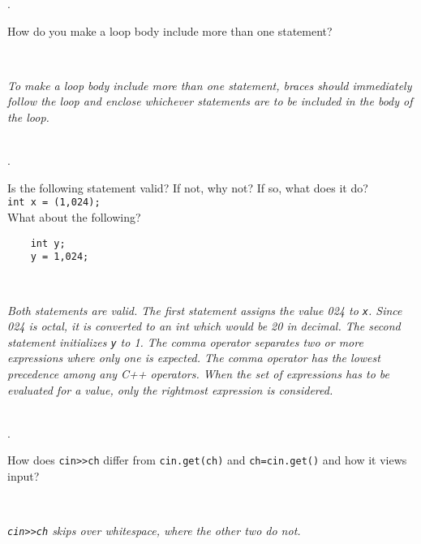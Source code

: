 \documentclass{amsart}
\begin{document}
. 
\begin{minipage}[t]{11.5 cm}
	How do you make a loop body include more than one statement?
\end{minipage} \\[1ex]
\phantom{2. } 
\begin{minipage}[t]{11.5 cm}
	{\slshape To make a loop body include more than one statement, braces should immediately follow the loop and enclose whichever statements are to be included in the body of the loop.} 
\end{minipage} 
\\[.2cm]

. 
\begin{minipage}[t]{11.5 cm}
	Is the following statement valid? If not, why not? If so, what does it do? \\[1ex]
\verb+int x = (1,024);+ \\[1 ex]
What about the following?
\begin{verbatim}
	int y;
	y = 1,024;
\end{verbatim}
\end{minipage} \\[1ex]
\phantom{3. } 
\begin{minipage}[t]{11.5 cm}
	{\slshape Both statements are valid. The first statement assigns the value 024 to \texttt{x}. Since 024 is octal, it is converted to an int which would be 20 in decimal. The second statement initializes \texttt{y} to 1. The comma operator separates two or more expressions where only one is expected. The comma operator has the lowest precedence among any C++ operators. When the set of expressions has to be evaluated for a value, only the rightmost expression is considered. } 
\end{minipage} 
\\[.2cm]

. 
\begin{minipage}[t]{11.5 cm}
	How does \verb+cin>>ch+ differ from \texttt{cin.get(ch)} and \texttt{ch=cin.get()} and how it views input?
\end{minipage} \\[1ex]
\phantom{2. } 
\begin{minipage}[t]{11.5 cm}
	{\slshape \verb+cin>>ch+ skips over whitespace, where the other two do not.} 
\end{minipage} 
\end{document}
